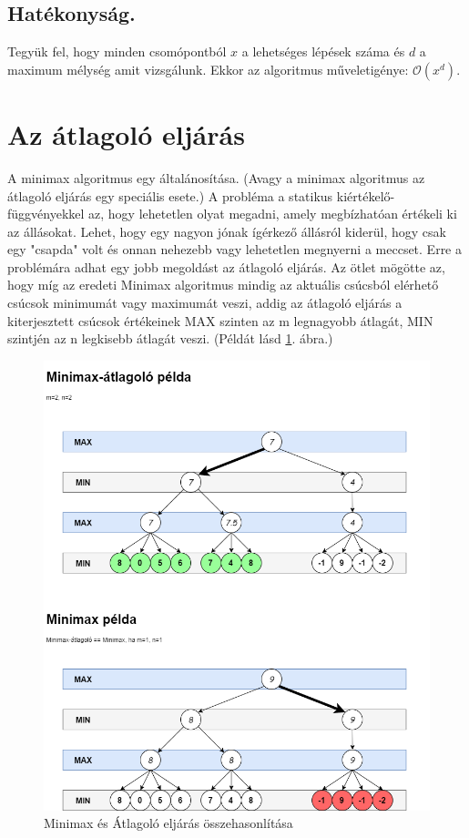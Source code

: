 \documentclass[twoside, a4paper, 12pt]{book}
\begin{document}
\subsection{Hatékonyság.} Tegyük fel, hogy minden csomópontból $x$ a lehetséges lépések száma és $d$ a maximum mélység amit vizsgálunk. Ekkor az algoritmus műveletigénye: $ \mathcal{O}(x^d)$.

\section{Az átlagoló eljárás}
A minimax algoritmus egy általánosítása. (Avagy a minimax algoritmus az átlagoló eljárás egy speciális esete.) A probléma a statikus kiértékelő-függvényekkel az, hogy lehetetlen olyat megadni, amely megbízhatóan értékeli ki az állásokat. Lehet, hogy egy nagyon jónak ígérkező állásról kiderül, hogy csak egy "csapda" volt és onnan nehezebb vagy lehetetlen megnyerni a meccset. Erre a problémára adhat egy jobb megoldást az átlagoló eljárás. Az ötlet mögötte az, hogy míg az eredeti Minimax algoritmus mindig az aktuális csúcsból elérhető csúcsok minimumát vagy maximumát veszi, addig az átlagoló eljárás a kiterjesztett csúcsok értékeinek MAX szinten az m legnagyobb átlagát, MIN szintjén az n legkisebb átlagát veszi. (Példát lásd \ref{fig:minimaxVsAverageExample}. ábra.)\cite{bevMiHu}

\begin{figure}[htbp]
	\centering
	\includegraphics[width=\textwidth]{img/minimaxVsAverageExample.png}
	\caption{Minimax és Átlagoló eljárás összehasonlítása\cite{bevMiHu}}
	\label{fig:minimaxVsAverageExample}
\end{figure}
\end{document}
